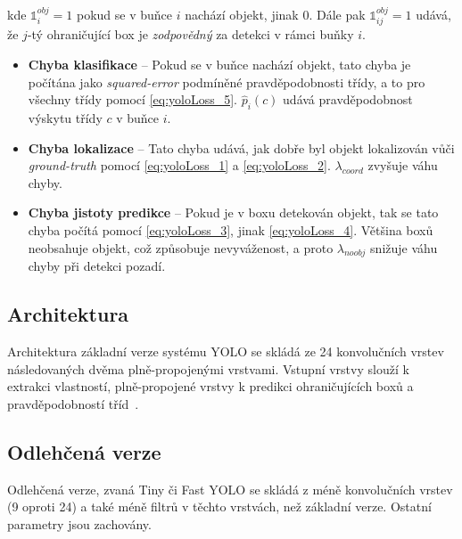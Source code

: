 \documentclass[czech]{ExcelAtFIT} %
\begin{document}
kde $\mathds{1}_{i}^{obj} = 1$ pokud se v buňce $i$ nachází objekt, jinak $0$. Dále pak $\mathds{1}_{ij}^{obj} = 1$ udává, že $j$-tý ohraničující box je \emph{zodpovědný} za detekci v rámci buňky $i$.

\begin{itemize}
    \item \textbf{Chyba klasifikace} -- Pokud se v buňce nachází objekt, tato chyba je počítána jako \emph{squared-error} podmíněné pravděpodobnosti třídy, a to pro všechny třídy pomocí \eqref{eq:yoloLoss_5}. $\hat{p}_i(c)$ udává pravděpodobnost výskytu třídy $c$ v buňce $i$.
    \item \textbf{Chyba lokalizace} -- Tato chyba udává, jak dobře byl objekt lokalizován vůči \emph{ground-truth} pomocí \eqref{eq:yoloLoss_1} a \eqref{eq:yoloLoss_2}. $\lambda_{coord}$ zvyšuje váhu chyby.
    \item \textbf{Chyba jistoty predikce} -- Pokud je v boxu detekován objekt, tak se tato chyba počítá pomocí \eqref{eq:yoloLoss_3}, jinak \eqref{eq:yoloLoss_4}. Většina boxů neobsahuje objekt, což způsobuje nevyváženost, a proto $\lambda_{noobj}$ snižuje váhu chyby při detekci pozadí.
\end{itemize}

\subsection{Architektura}
\label{yoloArch}
Architektura základní verze systému YOLO se skládá ze 24 konvolučních vrstev následovaných dvěma plně-propojenými vrstvami. Vstupní vrstvy slouží k extrakci vlastností, plně-propojené vrstvy k predikci ohraničujících boxů a pravděpodobností tříd~\cite{yolov1}.

\subsection{Odlehčená verze}
\label{tinyToloTeorie}
Odlehčená verze, zvaná Tiny či Fast YOLO se skládá z méně konvolučních vrstev (9 oproti 24) a také méně filtrů v těchto vrstvách, než základní verze. Ostatní parametry jsou zachovány.


\end{document}
